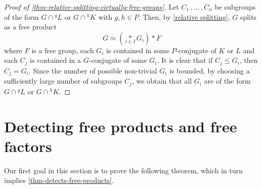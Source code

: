 \documentclass[a4paper]{amsart}
\theoremstyle{definition}
\theoremstyle{remark}
\begin{document}
\begin{proof}[Proof of \cref{thm-relative-splitting-virtually-free-groups}] Let \(C_1\,,\ldots\,, C_n\) be subgroups of the form \(G \cap {^gL}\) or \(G \cap {^hK}\) with \(g,h \in P\). Then, by \cref{relative splitting}, \(G\) splits as a free product \[G \simeq \left(\underset{i \in I}{\ast} G_i\right) * F\] where \(F\) is a free group, each \(G_i\) is contained in some \(P\)-conjugate of \(K\) or \(L\) and each \(C_j\) is contained in a \(G\)-conjugate of some \(G_i\). It is clear that if \(C_j \leq G_i\), then \(C_j = G_i\). Since the number of possible non-trivial \(G_i\) is bounded, by choosing a sufficiently large number of subgroups \(C_j\), we obtain that all \(G_i\) are of the form \(G \cap {^g L}\) or \(G \cap {^hK}\).
\end{proof}

\section{Detecting free products and free factors}\label{sect:main-thm}

Our first goal in this section is to prove the following theorem, which in turn implies \cref{thm-detects-free-products}.
\end{document}
